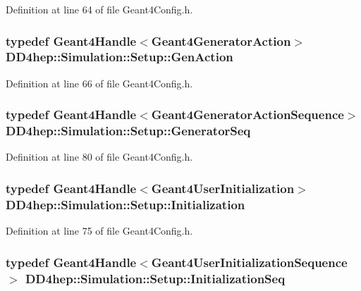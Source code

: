 Definition at line 64 of file Geant4Config.h.\hypertarget{namespace_d_d4hep_1_1_simulation_1_1_setup_a14c151f5ea2ebe374531259e0a2d5446}{
\subsubsection[{GenAction}]{\setlength{\rightskip}{0pt plus 5cm}typedef {\bf Geant4Handle}$<${\bf Geant4GeneratorAction}$>$ {\bf DD4hep::Simulation::Setup::GenAction}}}
\label{namespace_d_d4hep_1_1_simulation_1_1_setup_a14c151f5ea2ebe374531259e0a2d5446}


Definition at line 66 of file Geant4Config.h.\hypertarget{namespace_d_d4hep_1_1_simulation_1_1_setup_aeb672344cb12e47b674a3ca15d4eddad}{
\subsubsection[{GeneratorSeq}]{\setlength{\rightskip}{0pt plus 5cm}typedef {\bf Geant4Handle}$<${\bf Geant4GeneratorActionSequence}$>$ {\bf DD4hep::Simulation::Setup::GeneratorSeq}}}
\label{namespace_d_d4hep_1_1_simulation_1_1_setup_aeb672344cb12e47b674a3ca15d4eddad}


Definition at line 80 of file Geant4Config.h.\hypertarget{namespace_d_d4hep_1_1_simulation_1_1_setup_ad0eadfa9fa826619419b5350ce1bafae}{
\subsubsection[{Initialization}]{\setlength{\rightskip}{0pt plus 5cm}typedef {\bf Geant4Handle}$<${\bf Geant4UserInitialization}$>$ {\bf DD4hep::Simulation::Setup::Initialization}}}
\label{namespace_d_d4hep_1_1_simulation_1_1_setup_ad0eadfa9fa826619419b5350ce1bafae}


Definition at line 75 of file Geant4Config.h.\hypertarget{namespace_d_d4hep_1_1_simulation_1_1_setup_a37cbef7433b99bf178ae539e3696477d}{
\subsubsection[{InitializationSeq}]{\setlength{\rightskip}{0pt plus 5cm}typedef {\bf Geant4Handle}$<${\bf Geant4UserInitializationSequence}$>$ {\bf DD4hep::Simulation::Setup::InitializationSeq}}}
\label{namespace_d_d4hep_1_1_simulation_1_1_setup_a37cbef7433b99bf178ae539e3696477d}


